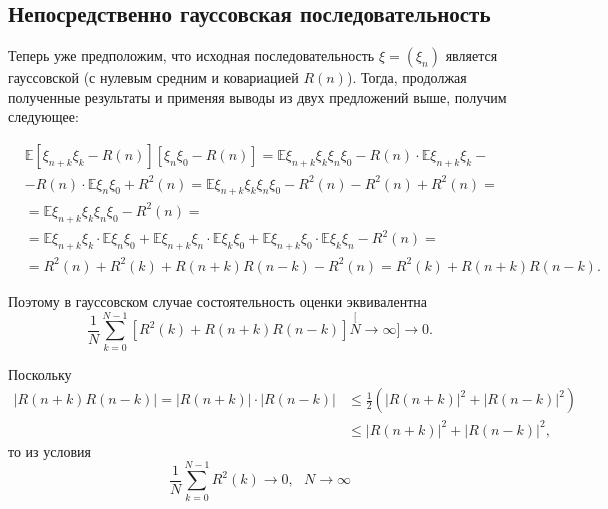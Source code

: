 		\subsection{Непосредственно гауссовская последовательность}
		Теперь уже предположим, что исходная последовательность $\xi = (\xi_n)$ является гауссовской (с нулевым средним и ковариацией $R(n)$). Тогда, продолжая полученные результаты и применяя выводы из двух предложений выше, получим следующее:
		
		\begin{equation*}
			\begin{split}
			&\mathbb{E}\left[\xi_{n+k}\xi_k - R(n)\right]\left[\xi_n\xi_0 - R(n)\right] = \mathbb{E}\xi_{n+k}\xi_k\xi_n\xi_0 - R(n) \cdot \mathbb{E}\xi_{n+k}\xi_k - \\ 
			&- R(n) \cdot \mathbb{E}\xi_n\xi_0 + R^2(n) = \mathbb{E}\xi_{n+k}\xi_k\xi_n\xi_0 - R^2(n) - R^2(n) + R^2(n) = \\
			&= \mathbb{E}\xi_{n+k}\xi_k\xi_n\xi_0 - R^2(n) = \\
			&= \mathbb{E}\xi_{n+k}\xi_k \cdot \mathbb{E}\xi_n\xi_0 + \mathbb{E}\xi_{n+k}\xi_n \cdot \mathbb{E}\xi_k\xi_0 + \mathbb{E}\xi_{n+k}\xi_0 \cdot \mathbb{E}\xi_k\xi_n - R^2(n) = \\
			&= R^2(n) + R^2(k) + R(n+k)R(n-k) - R^2(n) = R^2(k) + R(n+k)R(n-k).
			\end{split}
		\end{equation*}
	
		Поэтому в гауссовском случае состоятельность оценки эквивалентна
		\begin{equation}
			\frac{1}{N}\sum\limits_{k=0}^{N-1}\left[R^2(k) + R(n+k)R(n-k)\right] \stackrel[N \rightarrow \infty]{\longrightarrow}{} 0.
			\label{GAUSSIAN_SEQUENCE_COV_FUNC_EQU}
		\end{equation}
	
		\noindent Поскольку
		\begin{equation*}
			\begin{split}
			|R(n+k)R(n-k)| = |R(n+k)| \cdot |R(n-k)| &\leqslant \frac{1}{2}\left(|R(n+k)|^2 + |R(n-k)|^2\right) \\ 
			&\leqslant |R(n+k)|^2 + |R(n-k)|^2,
			\end{split}
		\end{equation*}
		\noindent то из условия
		\begin{equation}
			\frac{1}{N}\sum\limits_{k=0}^{N-1}R^2(k) \longrightarrow 0, \ \ \  N \rightarrow \infty
			\label{GAUSSIAN_SEQUENCE_COV_FUNC_SUFFICIENCY}
		\end{equation}
	

